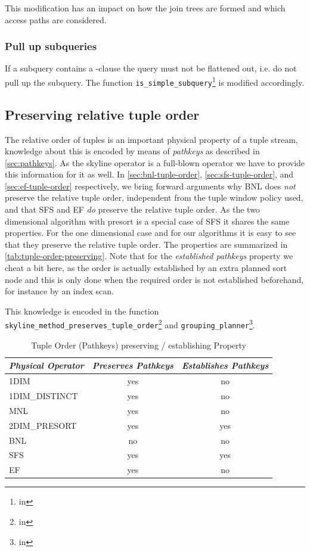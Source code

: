 This modification has an impact on how the join trees are formed and
which access paths are considered.

\subsubsection{Pull up subqueries}
If a subquery contains a -clause the query
must not be flattened out, i.e. do not pull up the subquery.  The function
\texttt{is\_simple\_subquery}\footnote{in
} is modified
accordingly.

\subsection{Preserving relative tuple order}
\label{sec:relative-tuple-order}
The relative order of tuples is an important physical property of a
tuple stream, knowledge about this is encoded by means of
\emph{pathkeys} as described in \autoref{sec:pathkeys}. As the
skyline operator is a
full-blown operator we have to provide this information for it
as well.  In \autoref{sec:bnl-tuple-order},
\ref{sec:sfs-tuple-order}, and \ref{sec:ef-tuple-order}
respectively, we bring forward arguments why BNL does \emph{not}
preserve the relative tuple order, independent from the tuple window
policy used, and that SFS and EF \emph{do} preserve the relative tuple
order.  As the two dimensional algorithm with presort is a special
case of SFS it shares the same properties.  For the one dimensional
case and for our \naive algorithms it is easy to see that they
preserve the relative tuple order.  The properties are summarized in
\autoref{tab:tuple-order-preserving}. Note that for the
\emph{established pathkeys} property we cheat a bit here, as the order
is actually established by an extra planned sort node and this is only
done when the required order is not established beforehand, for instance by
an index scan.

This knowledge is encoded in the function
\texttt{skyline\_method\_preserves\_tuple\_order}\footnote{in } and \texttt{grouping\_planner}\footnote{in }.

\begin{table}[htbp]
\centering
\begin{tabular}{lcc}
\emph{Physical Operator} & \emph{Preserves Pathkeys} & \emph{Establishes Pathkeys}\\
\hline
1DIM            & yes & no  \\
1DIM\_DISTINCT  & yes & no  \\
MNL             & yes & no  \\
2DIM\_PRESORT   & yes & yes \\
BNL             & no  & no  \\
SFS             & yes & yes \\
EF              & yes & no  \\
\end{tabular}
\caption{Tuple Order (Pathkeys) preserving / establishing Property}
\label{tab:tuple-order-preserving}
\end{table}


